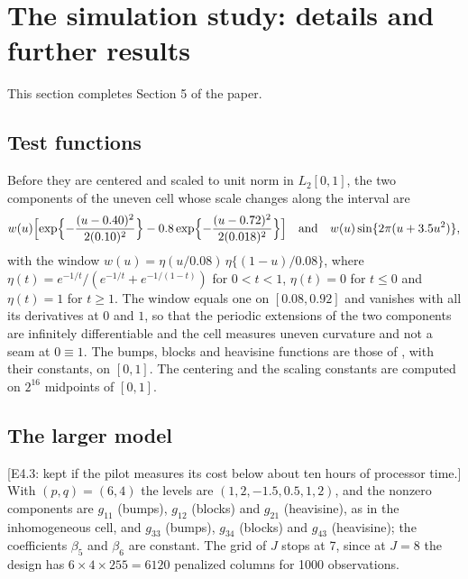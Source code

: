 \documentclass[10pt]{book}
\theoremstyle{definition}
\newcommand{\gcomp}[2]{g_{#1#2}}
\begin{document}
{\color{colR1}
\section{The simulation study: details and further results}
\label{sec:supp-sim}

This section completes Section 5 of the paper.

\subsection*{Test functions}

Before they are centered and scaled to unit norm in $L_2[0,1]$, the two
components of the uneven cell whose scale changes along the interval are
\[
  w(u)\Bigl[\exp\Bigl\{-\frac{(u-0.40)^{2}}{2(0.10)^{2}}\Bigr\}
  - 0.8\exp\Bigl\{-\frac{(u-0.72)^{2}}{2(0.018)^{2}}\Bigr\}\Bigr]
  \quad\text{and}\quad
  w(u)\sin\{2\pi(u + 3.5u^{2})\},
\]
with the window $w(u) = \eta(u/0.08)\,\eta\{(1-u)/0.08\}$, where
$\eta(t) = e^{-1/t}/(e^{-1/t} + e^{-1/(1-t)})$ for $0 < t < 1$,
$\eta(t) = 0$ for $t \le 0$ and $\eta(t) = 1$ for $t \ge 1$. The window equals
one on $[0.08, 0.92]$ and vanishes with all its derivatives at $0$ and $1$, so
that the periodic extensions of the two components are infinitely
differentiable and the cell measures uneven curvature and not a seam at
$0 \equiv 1$. The bumps, blocks and heavisine functions are those of
\citet{Donoho-Johnstone-1994}, with their constants, on $[0,1]$. The
centering and the scaling constants are computed on $2^{16}$ midpoints of
$[0,1]$.

\subsection*{The larger model}

[E4.3: kept if the pilot measures its cost below about ten hours of processor
time.] With $(p,q) = (6,4)$ the levels are $(1, 2, -1.5, 0.5, 1, 2)$, and the
nonzero components are $\gcomp{1}{1}$ (bumps), $\gcomp{1}{2}$ (blocks) and
$\gcomp{2}{1}$ (heavisine), as in the inhomogeneous cell, and
$\gcomp{3}{3}$ (bumps), $\gcomp{3}{4}$ (blocks) and $\gcomp{4}{3}$
(heavisine); the coefficients $\beta_5$ and $\beta_6$ are constant. The grid
of $J$ stops at 7, since at $J = 8$ the design has $6 \times 4 \times 255 =
6120$ penalized columns for 1000 observations.

}
\end{document}
